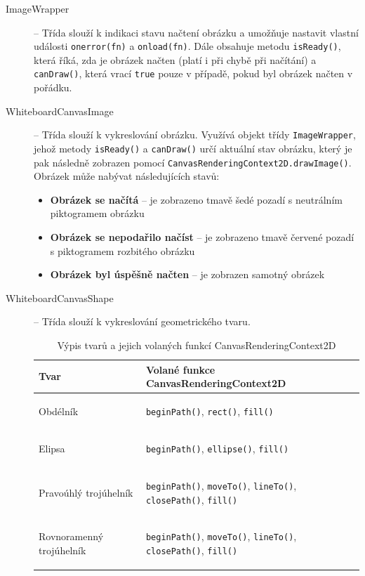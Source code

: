 \begin{sloppypar*}
\begin{description}
	\item[ImageWrapper] -- Třída slouží k indikaci stavu načtení obrázku a umožňuje nastavit vlastní události \texttt{onerror(fn)} a \texttt{onload(fn)}. Dále obsahuje metodu \texttt{isReady()}, která říká, zda je obrázek načten (platí i při chybě při načítání) a \texttt{canDraw()}, která vrací \texttt{true} pouze v případě, pokud byl obrázek načten v pořádku.
	\item[WhiteboardCanvasImage] -- Třída slouží k vykreslování obrázku. Využívá objekt třídy \texttt{ImageWrapper}, jehož metody \texttt{isReady()} a \texttt{canDraw()} určí aktuální stav obrázku, který je pak následně zobrazen pomocí \texttt{CanvasRenderingContext2D.drawImage()}. Obrázek může nabývat následujících stavů:
	\begin{itemize}
		\item \textbf{Obrázek se načítá} -- je zobrazeno tmavě šedé pozadí s neutrálním piktogramem obrázku
		\item \textbf{Obrázek se nepodařilo načíst} -- je zobrazeno tmavě červené pozadí s piktogramem rozbitého obrázku
		\item \textbf{Obrázek byl úspěšně načten} -- je zobrazen samotný obrázek
	\end{itemize}
	\item[WhiteboardCanvasShape] -- Třída slouží k vykreslování geometrického tvaru.
	\begin{table}[h!]
		\centering
		\caption[Výpis tvarů a jejich volaných funkcí CanvasRenderingContext2D]{Výpis tvarů a jejich volaných funkcí CanvasRenderingContext2D}
		\label{tab:WhiteboardCanvasShape/CanvasRenderingContext2D/Functions}
		\begin{tabular}{ll}
			\toprule
			Tvar & Volané funkce CanvasRenderingContext2D\\
			\midrule
			Obdélník & \begin{sloppypar*}\texttt{beginPath()}, \texttt{rect()}, \texttt{fill()}\end{sloppypar*}\\
			Elipsa & \begin{sloppypar*}\texttt{beginPath()}, \texttt{ellipse()}, \texttt{fill()}\end{sloppypar*}\\
			Pravoúhlý trojúhelník & \begin{sloppypar*}\texttt{beginPath()}, \texttt{moveTo()}, \texttt{lineTo()}, \texttt{closePath()}, \texttt{fill()}\end{sloppypar*}\\
			Rovnoramenný trojúhelník & \begin{sloppypar*}\texttt{beginPath()}, \texttt{moveTo()}, \texttt{lineTo()}, \texttt{closePath()}, \texttt{fill()}\end{sloppypar*}\\

\end{tabular}
\end{table}
\end{description}
\end{sloppypar*}
